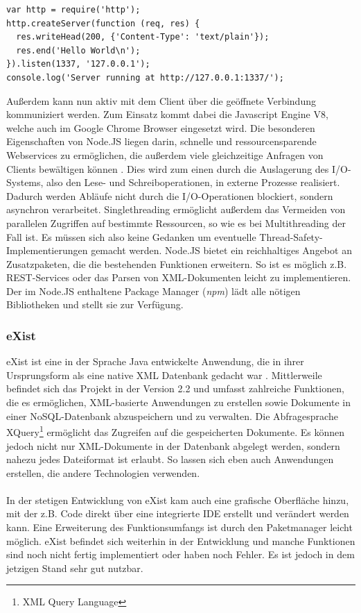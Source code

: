 \begin{lstlisting}
var http = require('http');
http.createServer(function (req, res) {
  res.writeHead(200, {'Content-Type': 'text/plain'});
  res.end('Hello World\n');
}).listen(1337, '127.0.0.1');
console.log('Server running at http://127.0.0.1:1337/');
\end{lstlisting}

Außerdem kann nun aktiv mit dem Client über die geöffnete Verbindung kommuniziert werden. Zum Einsatz kommt dabei die Javascript Engine V8, welche auch im Google Chrome Browser eingesetzt wird. Die besonderen Eigenschaften von Node.JS liegen darin, schnelle und ressourcensparende Webservices zu ermöglichen, die außerdem viele gleichzeitige Anfragen von Clients bewältigen können \cite{cantelon:nodejs}. Dies wird zum einen durch die Auslagerung des I/O-Systems, also den Lese- und Schreiboperationen, in externe Prozesse realisiert. Dadurch werden Abläufe nicht durch die I/O-Operationen blockiert, sondern asynchron verarbeitet. Singlethreading ermöglicht außerdem das Vermeiden von parallelen Zugriffen auf bestimmte Ressourcen, so wie es bei Multithreading der Fall ist. Es müssen sich also keine Gedanken um eventuelle Thread-Safety-Implementierungen gemacht werden. Node.JS bietet ein reichhaltiges Angebot an Zusatzpaketen, die die bestehenden Funktionen erweitern. So ist es möglich z.B. REST-Services oder das Parsen von XML-Dokumenten leicht zu implementieren. Der im Node.JS enthaltene Package Manager (\textit{npm}) lädt alle nötigen Bibliotheken und stellt sie zur Verfügung.

\subsubsection{eXist}
\label{subsec:eXist}
eXist \cite{existwebsite} ist eine in der Sprache Java entwickelte Anwendung, die in ihrer Ursprungsform als eine native XML Datenbank gedacht war \cite{siegel:exist}. Mittlerweile befindet sich das Projekt in der Version 2.2 und umfasst zahlreiche Funktionen, die es ermöglichen, XML-basierte Anwendungen zu erstellen sowie Dokumente in einer NoSQL-Datenbank abzuspeichern und zu verwalten. Die Abfragesprache XQuery\footnote[1]{XML Query Language} ermöglicht das Zugreifen auf die gespeicherten Dokumente. Es können jedoch nicht nur XML-Dokumente in der Datenbank abgelegt werden, sondern nahezu jedes Dateiformat ist erlaubt. So lassen sich eben auch Anwendungen erstellen, die andere Technologien verwenden.
\\
\\
In der stetigen Entwicklung von eXist kam auch eine grafische Oberfläche hinzu, mit der z.B. Code direkt über eine integrierte IDE erstellt und verändert werden kann. Eine Erweiterung des Funktionsumfangs ist durch den Paketmanager leicht möglich. eXist befindet sich weiterhin in der Entwicklung und manche Funktionen sind noch nicht fertig implementiert oder haben noch Fehler. Es ist jedoch in dem jetzigen Stand sehr gut nutzbar.

